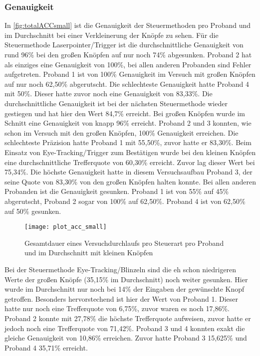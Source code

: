 \subsubsection{Genauigkeit}
In \autoref{fig:totalACCsmall} ist die Genauigkeit der Steuermethoden pro Proband und im Durchschnitt bei einer Verkleinerung der Knöpfe zu sehen. Für die Steuermethode Laserpointer/Trigger ist die durchschnittliche Genauigkeit von rund 96\% bei den großen Knöpfen auf nur noch 74\% abgesunken. Proband 2 hat als einziges eine Genauigkeit von 100\%, bei allen anderen Probanden sind Fehler aufgetreten. Proband 1 ist von 100\% Genauigkeit im Versuch mit großen Knöpfen auf nur noch 62,50\% abgerutscht. Die schlechteste Genauigkeit hatte Proband 4 mit 50\%. Dieser hatte zuvor noch eine Genauigkeit von 83,33\%. Die durchschnittliche Genauigkeit ist bei der nächsten Steuermethode wieder gestiegen und hat hier den Wert 84,7\% erreicht. Bei großen Knöpfen wurde im Schnitt eine Genauigkeit von knapp 96\% erreicht. Proband 2 und 3 konnten, wie schon im Versuch mit den großen Knöpfen, 100\% Genauigkeit erreichen. Die schlechteste Präzision hatte Proband 1 mit 55,50\%, zuvor hatte er 83,30\%. Beim Einsatz von Eye-Tracking/Trigger zum Bestätigen wurde bei den kleinen Knöpfen eine durchschnittliche Trefferquote von 60,30\% erreicht. Zuvor lag dieser Wert bei 75,34\%. Die höchste Genauigkeit hatte in diesem Versuchsaufbau Proband 3, der seine Quote von 83,30\% von den großen Knöpfen halten konnte. Bei allen anderen Probanden ist die Genauigkeit gesunken. Proband 1 ist von 55\% auf 45\% abgerutscht, Proband 2 sogar von 100\% auf 62,50\%. Proband 4 ist von 62,50\% auf 50\% gesunken.

\begin{figure}[!htbp]
	\centering
	\texttt{[image: plot\_acc\_small]}
	\caption[Gesamtdauer eines Versuchdurchlaufs pro Steuerart pro Proband und im Durchschnitt mit kleinen Knöpfen]{Gesamtdauer eines Versuchdurchlaufs pro Steuerart pro Proband und im Durchschnitt mit kleinen Knöpfen}
	\label{fig:totalACCsmall}
\end{figure}

Bei der Steuermethode Eye-Tracking/Blinzeln sind die eh schon niedrigeren Werte der großen Knöpfe (35,15\% im Durchschnitt) noch weiter gesunken. Hier wurde im Durchschnitt nur noch bei 14\% der Eingaben der gewünschte Knopf getroffen. Besonders hervorstechend ist hier der Wert von Proband 1. Dieser hatte nur noch eine Trefferquote von 6,75\%, zuvor waren es noch 17,86\%. Proband 2 konnte mit 27,78\% die höchste Trefferquote aufweisen, zuvor hatte er jedoch noch eine Trefferquote von 71,42\%. Proband 3 und 4 konnten exakt die gleiche Genauigkeit von 10,86\% erreichen. Zuvor hatte Proband 3 15,625\% und Proband 4 35,71\% erreicht. 

